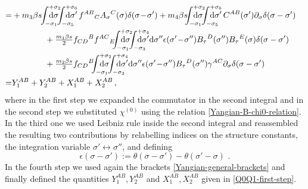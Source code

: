\documentclass[12pt]{article}
\numberwithin{equation}{section}
\begin{document}
\begin{align}
\notag \\
=&+m_{3}\beta s \!\! \int_{-\sigma_{1}}^{+\sigma_{2}}\!\!\!\!\!\!\!\!\!\!\mathrm{d}\sigma
\!\! \int_{-\sigma_{5}}^{+\sigma_{6}}\!\!\!\!\!\!\!\!\!\!\mathrm{d}\sigma' \,f^{AB}{}_{C}A_{\sigma}{}^{C}(\sigma)\delta(\sigma \!-\! \sigma')+m_{4} \beta s\!\!\! \int_{-\sigma_{1}}^{+\sigma_{2}}\!\!\!\!\!\!\!\!\!\!\mathrm{d}\sigma
\!\! \int_{-\sigma_{5}}^{+\sigma_{6}}\!\!\!\!\!\!\!\!\!\!\mathrm{d}\sigma' \,C^{AB}(\sigma')\partial_{\sigma}\delta(\sigma-\sigma')
\notag \\
&\qquad \qquad +\tfrac{m_{1}\beta s}{2}f_{CD}{}^{B}f^{AC}{}_{E}\!\!\!\int_{-\sigma_{1}}^{+\sigma_{2}}\!\!\!\!\!\!\!\!\!\!\mathrm{d}\sigma \!\! \int_{-\sigma_{3}}^{+\sigma_{4}}\!\!\!\!\!\!\!\!\!\!\mathrm{d}\sigma'\mathrm{d}\sigma''  \epsilon(\sigma'\!-\!\sigma'') B_{\tau}{}^{D}(\sigma'')B_{\tau}{}^{E}(\sigma)\delta(\sigma-\sigma')
\notag \\
&\qquad \qquad +\tfrac{m_{2}\beta s}{2}f_{CD}{}^{B}\!\!\!\int_{-\sigma_{1}}^{+\sigma_{2}}\!\!\!\!\!\!\!\!\!\!\mathrm{d}\sigma \!\! \int_{-\sigma_{3}}^{+\sigma_{4}}\!\!\!\!\!\!\!\!\!\!\mathrm{d}\sigma'\mathrm{d}\sigma''  \epsilon(\sigma'\!-\!\sigma'') B_{\tau}{}^{D}(\sigma'')\gamma^{AC}\partial_{\sigma}\delta(\sigma-\sigma')
\notag \\
=& Y_{1}^{AB}+Y_{2}^{AB}+X_{1}^{AB}+X_{2}^{AB} \, ,
\label{Q0-Q1-bracket-intermediate}
\end{align}
where in the first step we expanded the commutator in the second integral and in the second step we substituted $\chi^{(0)}$ using the relation \eqref{Yangian-B-chi0-relation}. In the third one we used Leibniz rule inside the second integral and reassembled the resulting two contributions by relabelling indices on the structure constants, the integration variable $\sigma'\leftrightarrow\sigma''$, and defining
\begin{equation}\label{epsilon-def}
\epsilon(\sigma-\sigma'):=\theta(\sigma-\sigma')-\theta(\sigma'-\sigma) \,\, .
\end{equation}
In the fourth step we used again the brackets \eqref{Yangian-general-brackets} and finally defined the quantities $Y_{1}^{AB},Y_{2}^{AB}$ and $X_{1}^{AB},X_{2}^{AB}$ given in \eqref{Q0Q1-first-step}.
\end{document}
